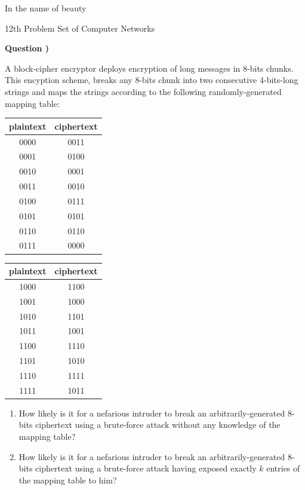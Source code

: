 \documentclass{article}
\newcounter{questionnumber}
\newcommand{\Q}{
\textbf{Question \thequestionnumber)}
\stepcounter{questionnumber}
}
\begin{document}
\LARGE
\begin{center}

In the name of beauty


12th Problem Set of Computer Networks

\end{center}
\hrulefill
\Large

\Q

A block-cipher encryptor deploys encryption of long messages in 8-bits chunks. This encyption scheme, breaks any 8-bits chunk into two consecutive 4-bits-long strings and maps the strings according to the following randomly-generated mapping table:
\begin{table}[h]
\centering
\Large
\begin{tabular}{cc}
plaintext&ciphertext\\\hline\hline
0000&0011\\\hline
0001&0100\\\hline
0010&0001\\\hline
0011&0010\\\hline
0100&0111\\\hline
0101&0101\\\hline
0110&0110\\\hline
0111&0000\\\hline
\end{tabular}
\begin{tabular}{cc}
plaintext&ciphertext\\\hline\hline
1000&1100\\\hline
1001&1000\\\hline
1010&1101\\\hline
1011&1001\\\hline
1100&1110\\\hline
1101&1010\\\hline
1110&1111\\\hline
1111&1011\\\hline
\end{tabular}
\end{table}
\begin{enumerate}[label=\alph*)]
\item
How likely is it for a nefarious intruder to break an arbitrarily-generated 8-bits ciphertext using a brute-force attack without any knowledge of the mapping table?
\item
How likely is it for a nefarious intruder to break an arbitrarily-generated 8-bits ciphertext using a brute-force attack having exposed exactly $k$ entries of the mapping table to him?
\end{enumerate}
\end{document}
